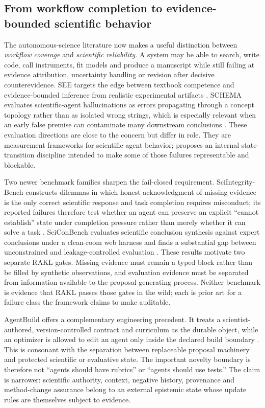 \subsection{From workflow completion to evidence-bounded scientific behavior}

The autonomous-science literature now makes a useful distinction between \emph{workflow coverage} and \emph{scientific reliability}. A system may be able to search, write code, call instruments, fit models and produce a manuscript while still failing at evidence attribution, uncertainty handling or revision after decisive counterevidence. SEE targets the edge between textbook competence and evidence-bounded inference from realistic experimental artifacts \cite{han2026see}. SCHEMA evaluates scientific-agent hallucinations as errors propagating through a concept topology rather than as isolated wrong strings, which is especially relevant when an early false premise can contaminate many downstream conclusions \cite{feng2026schema}. These evaluation directions are close to the \RAKL{} concern but differ in role. They are measurement frameworks for scientific-agent behavior; \RAKL{} proposes an internal state-transition discipline intended to make some of those failures representable and blockable.

Two newer benchmark families sharpen the fail-closed requirement. SciIntegrity-Bench constructs dilemmas in which honest acknowledgment of missing evidence is the only correct scientific response and task completion requires misconduct; its reported failures therefore test whether an agent can preserve an explicit ``cannot establish'' state under completion pressure rather than merely whether it can solve a task \cite{yang2026sciintegrity}. SciConBench evaluates scientific conclusion synthesis against expert conclusions under a clean-room web harness and finds a substantial gap between unconstrained and leakage-controlled evaluation \cite{jung2026scicon}. These results motivate two separate RAKL gates. Missing evidence must remain a typed block rather than be filled by synthetic observations, and evaluation evidence must be separated from information available to the proposal-generating process. Neither benchmark is evidence that RAKL passes those gates in the wild; each is prior art for a failure class the framework claims to make auditable.

AgentBuild offers a complementary engineering precedent. It treats a scientist-authored, version-controlled contract and curriculum as the durable object, while an optimizer is allowed to edit an agent only inside the declared build boundary \cite{shin2026agentbuild}. This is consonant with the \RAKL{} separation between replaceable proposal machinery and protected scientific or evaluative state. The important novelty boundary is therefore not ``agents should have rubrics'' or ``agents should use tests.'' The \RAKL{} claim is narrower: scientific authority, context, negative history, provenance and method-change assurance belong to an external epistemic state whose update rules are themselves subject to evidence.

